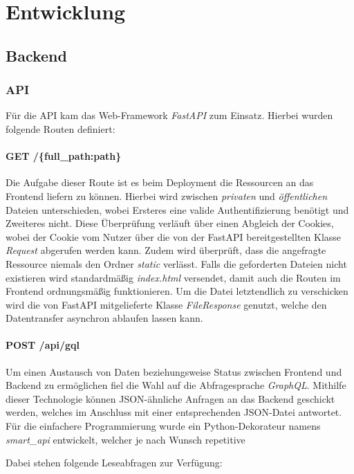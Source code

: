 \chapter{Entwicklung}

\section{Backend}
\subsection{API}
Für die API kam das Web-Framework \textit{FastAPI} zum Einsatz. Hierbei wurden folgende Routen definiert:

\subsubsection{GET /\{full\_path:path\}}
Die Aufgabe dieser Route ist es beim Deployment die Ressourcen an das Frontend liefern zu können. Hierbei wird zwischen \textit{privaten} und \textit{öffentlichen} Dateien unterschieden, wobei Ersteres eine valide Authentifizierung benötigt und Zweiteres nicht. Diese Überprüfung verläuft über einen Abgleich der Cookies, wobei der Cookie vom Nutzer über die von der FastAPI bereitgestellten Klasse \textit{Request} abgerufen werden kann. Zudem wird überprüft, dass die angefragte Ressource niemals den Ordner \textit{static} verlässt. Falls die geforderten Dateien nicht existieren wird standardmäßig \textit{index.html} versendet, damit auch die Routen im Frontend ordnungsmäßig funktionieren. Um die Datei letztendlich zu verschicken wird die von FastAPI mitgelieferte Klasse \textit{FileResponse} genutzt, welche den Datentransfer asynchron ablaufen lassen kann. \cite{fastapi-fileresponse}

\subsubsection{POST /api/gql}
Um einen Austausch von Daten beziehungsweise Status zwischen Frontend und Backend zu ermöglichen fiel die Wahl auf die Abfragesprache \textit{GraphQL}. Mithilfe dieser Technologie können JSON-ähnliche Anfragen an das Backend geschickt werden, welches im Anschluss mit einer entsprechenden JSON-Datei antwortet. Für die einfachere Programmierung wurde ein Python-Dekorateur namens \textit{smart\_api} entwickelt, welcher je nach Wunsch repetitive 

Dabei stehen folgende Leseabfragen zur Verfügung:


